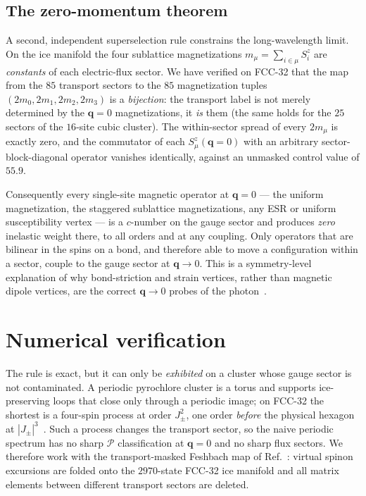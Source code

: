 \documentclass[aps,prl,preprint,amsmath,amssymb,superscriptaddress,
longbibliography,floatfix]{revtex4-2}
\newcommand{\Jpm}{J_{\pm}}
\DeclareRobustCommand{\bq}{\bm q}
\newcommand{\PP}{\mathcal{P}}
\begin{document}
\subsection{The zero-momentum theorem}
\label{sec:qzero}

A second, independent superselection rule constrains the long-wavelength
limit.  On the ice manifold the four sublattice magnetizations
$m_\mu=\sum_{i\in\mu}S^z_i$ are \emph{constants} of each electric-flux sector.
We have verified on FCC-32 that the map from the $85$ transport sectors to the
$85$ magnetization tuples $(2m_0,2m_1,2m_2,2m_3)$ is a \emph{bijection}: the
transport label is not merely determined by the $\bq=0$ magnetizations, it
\emph{is} them (the same holds for the $25$ sectors of the $16$-site cubic
cluster).  The within-sector spread of every $2m_\mu$ is exactly zero, and the
commutator of each $S^z_\mu(\bq=0)$ with an arbitrary sector-block-diagonal
operator vanishes identically, against an unmasked control value of $55.9$.

Consequently every single-site magnetic operator at $\bq=0$ --- the uniform
magnetization, the staggered sublattice magnetizations, any ESR or uniform
susceptibility vertex --- is a $c$-number on the gauge sector and produces
\emph{zero} inelastic weight there, to all orders and at any coupling.  Only
operators that are bilinear in the spins on a bond, and therefore able to move
a configuration within a sector, couple to the gauge sector at $\bq\to0$.  This
is a symmetry-level explanation of why bond-striction and strain vertices,
rather than magnetic dipole vertices, are the correct $\bq\to0$ probes of the
photon~\cite{Patri2020,SimonPatriKim2022}.

\section{Numerical verification}
\label{sec:numerics}

The rule is exact, but it can only be \emph{exhibited} on a cluster whose gauge
sector is not contaminated.  A periodic pyrochlore cluster is a torus and
supports ice-preserving loops that close only through a periodic image; on
FCC-32 the shortest is a four-spin process at order $\Jpm^2$, one order
\emph{before} the physical hexagon at $|\Jpm|^3$~\cite{ZhouKimMask}.  Such a
process changes the transport sector, so the naive periodic spectrum has no
sharp $\PP$ classification at $\bq=0$ and no sharp flux sectors.  We therefore
work with the transport-masked Feshbach map of Ref.~\cite{ZhouKimMask}: virtual
spinon excursions are folded onto the $2970$-state FCC-32 ice manifold and all
matrix elements between different transport sectors are deleted.
\end{document}
